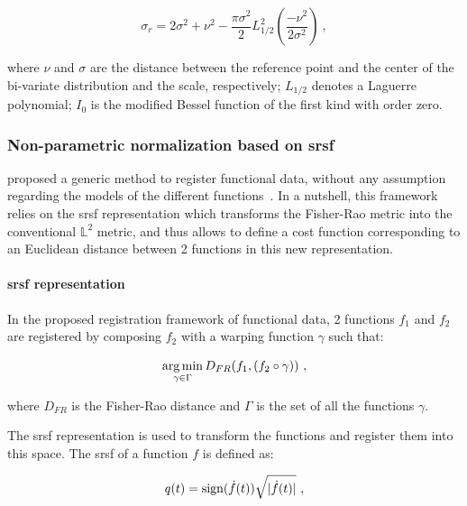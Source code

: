 \begin{equation}
  \sigma_{r} = 2\sigma^2+\nu^2-\frac{\pi\sigma^2}{2}L_{1/2}^2\left(\frac{-\nu^2}{2\sigma^2}\right)  \ ,
  \label{eq:var}
\end{equation}

\noindent where $\nu$ and $\sigma$ are the distance between the reference point and the center of the bi-variate distribution and the scale, respectively; $L_{1/2}$ denotes a Laguerre polynomial; $I_0$ is the modified Bessel function of the first kind with order zero.

\subsubsection{Non-parametric normalization based on \acs*{srsf}}\label{subsubsec:chp5:T2-norm:gen-model}

\citeauthor{Srivastava2011} proposed a generic method to register functional data, without any assumption regarding the models of the different functions~\cite{Srivastava2011}. 
In a nutshell, this framework relies on the \ac{srsf} representation which transforms the Fisher-Rao metric into the conventional $\mathbb{L}^2$ metric, and thus allows to define a cost function corresponding to an Euclidean distance between 2 functions in this new representation.

\paragraph{\Ac{srsf} representation}

In the proposed registration framework of functional data, 2 functions $f_1$ and $f_2$ are registered by composing $f_2$ with a warping function $\gamma$ such that:

\begin{equation}
  \operatorname*{arg\,min}_{\gamma \in \Gamma} D_{FR}(f_1, (f_2 \circ \gamma)) \ ,
  \label{eq:regfun}
\end{equation}

\noindent where $D_{FR}$ is the Fisher-Rao distance and $\Gamma$ is the set of all the functions $\gamma$.

The \ac{srsf} representation is used to transform the functions and register them into this space.
The \ac{srsf} of a function $f$ is defined as:

\begin{equation}
  q(t) = \operatorname*{sign}(\dot{f}(t))\sqrt{|\dot{f}(t)|} \ ,
  \label{eq:srsf}
\end{equation}

